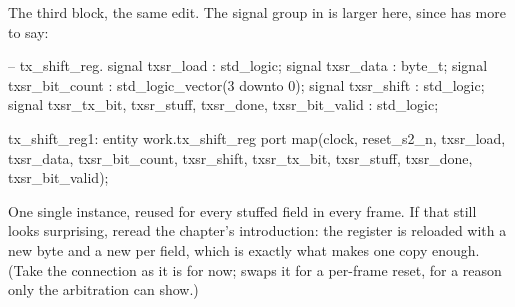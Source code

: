 The third block, the same edit. The signal group in  is larger
here, since  has more to say:

\begin{vhdlcode}
    -- tx_shift_reg.
    signal txsr_load                                          : std_logic;
    signal txsr_data                                          : byte_t;
    signal txsr_bit_count                                     : std_logic_vector(3 downto 0);
    signal txsr_shift                                         : std_logic;
    signal txsr_tx_bit, txsr_stuff, txsr_done, txsr_bit_valid : std_logic;
\end{vhdlcode}

\begin{vhdlcode}
    tx_shift_reg1: entity work.tx_shift_reg
        port map(clock, reset_s2_n, txsr_load, txsr_data, txsr_bit_count, txsr_shift,
                 txsr_tx_bit, txsr_stuff, txsr_done, txsr_bit_valid);
\end{vhdlcode}

One single instance, reused for every stuffed field in every frame. If that still looks surprising,
reread the chapter's introduction: the register is reloaded with a new byte and a new
 per field, which is exactly what makes one copy enough. (Take the 
connection as it is for now;  swaps it for a per-frame reset, for a reason only the
arbitration can show.)
